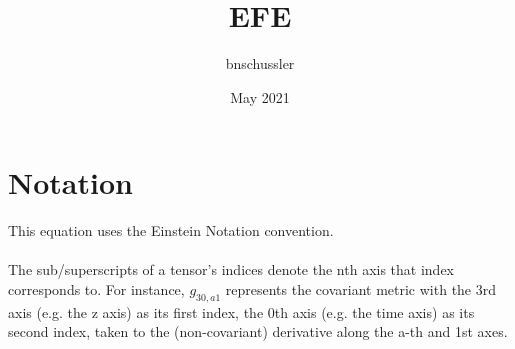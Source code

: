 \documentclass{article}
\title{EFE}
\author{bnschussler }
\date{May 2021}
\begin{document}
\maketitle

\section{Notation}
\indent\indent This equation uses the Einstein Notation convention.
\\\\
\indent The sub/superscripts of a tensor's indices denote the nth axis that index corresponds to. For instance, $g_{30,a1}$ represents the covariant metric with the 3rd axis (e.g. the z axis) as its first index, the 0th axis (e.g. the time axis) as its second index, taken to the (non-covariant) derivative along the a-th and 1st axes.
\end{document}
